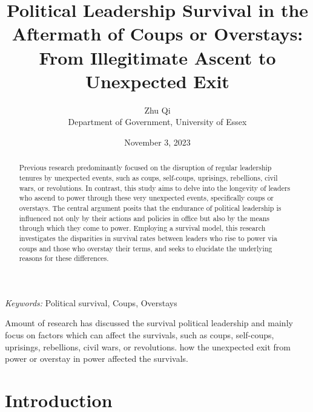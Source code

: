 \documentclass[
  12pt,
  a4paper,
  12pt]{article}
\begin{document}
\def\spacingset#1{\renewcommand{\baselinestretch}%
{#1}\small\normalsize} \spacingset{1}



\date{November 3, 2023}
\title{\bf Political Leadership Survival in the Aftermath of Coups or
Overstays: From Illegitimate Ascent to Unexpected Exit}
\author{
Zhu Qi\\
Department of Government, University of Essex\\
}
\maketitle

\bigskip
\bigskip
\begin{abstract}
Previous research predominantly focused on the disruption of regular
leadership tenures by unexpected events, such as coups, self-coups,
uprisings, rebellions, civil wars, or revolutions. In contrast, this
study aims to delve into the longevity of leaders who ascend to power
through these very unexpected events, specifically coups or overstays.
The central argument posits that the endurance of political leadership
is influenced not only by their actions and policies in office but also
by the means through which they come to power. Employing a survival
model, this research investigates the disparities in survival rates
between leaders who rise to power via coups and those who overstay their
terms, and seeks to elucidate the underlying reasons for these
differences.
\end{abstract}

\noindent%
{\it Keywords:} Political survival, Coups, Overstays
\vfill

\newpage
\spacingset{1.9} %
\ifdefined\Shaded\renewenvironment{Shaded}{\begin{tcolorbox}[breakable, interior hidden, borderline west={3pt}{0pt}{shadecolor}, enhanced, frame hidden, sharp corners, boxrule=0pt]}{\end{tcolorbox}}\fi

Amount of research has discussed the survival political leadership and
mainly focus on factors which can affect the survivals, such as coups,
self-coups, uprisings, rebellions, civil wars, or revolutions. how the
unexpected exit from power or overstay in power affected the survivals.

\hypertarget{introduction}{%
\section{Introduction}\label{introduction}}
\end{document}
